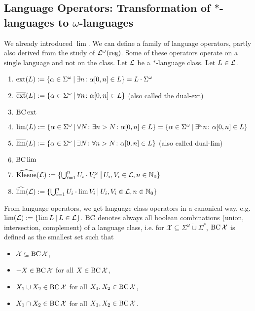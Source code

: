 
\subsection{Language Operators: Transformation of $*$-languages to $\omega$-languages}

We already introduced $\lim$. We can define a family of language operators, partly also derived from the study of $\mathcal{L}^\omega(\text{reg})$. Some of these operators operate on a single language and not on the class. Let $\mathcal{L}$ be a $*$-language class. Let $L \in \mathcal{L}$.

\begin{enumerate}
\item $\ext(L) := \Set{\alpha \in \Sigma^\omega}{ \exists n \colon \alpha[0,n] \in L} = L \cdot \Sigma^\omega$
\item $\dext(L) := \Set{\alpha \in \Sigma^\omega}{ \forall n \colon \alpha[0,n] \in L}$ (also called the dual-ext)
\item $\operatorname{BC} \operatorname{ext}$
\item $\lim(L) := \Set{ \alpha \in \Sigma^\omega }{ \forall N \colon \exists n > N \colon \alpha[0,n] \in L } = \Set{ \alpha \in \Sigma^\omega }{ \exists^\omega n \colon \alpha[0,n] \in L }$
\item $\dlim(L) := \Set{ \alpha \in \Sigma^\omega }{ \exists N \colon \forall n > N \colon \alpha[0,n] \in L }$ (also called dual-lim)
\item $\operatorname{BC} \lim$
\item $\Kleene(\Lang) := \Set{ \bigcup_{i=1}^n U_i \cdot V_i^\omega}{U_i, V_i \in \Lang, n \in \N_0}$
\item $\limClosure(\Lang) := \Set{\bigcup_{i=1}^n U_i \cdot \lim V_i}{U_i, V_i \in \Lang, n \in \N_0}$
\end{enumerate}

From language operators, we get language class operators in a canonical way, e.g. $\lim(\Lang) := \Set{\lim L}{L \in \Lang}$. $\operatorname{BC}$ denotes always all boolean combinations (union, intersection, complement) of a language class, i.e. for $\mathcal{X} \subseteq \Sigma^\omega \mathbin{\dot\cup} \Sigma^*$, $\operatorname{BC} \mathcal{X}$ is defined as the smallest set such that
\begin{itemize}
\item $\mathcal{X} \subseteq \operatorname{BC} \mathcal{X}$,
\item $-X \in \operatorname{BC} \mathcal{X}$ for all $X \in \operatorname{BC} \mathcal{X}$,
\item $X_1 \cup X_2 \in \operatorname{BC} \mathcal{X}$ for all $X_1,X_2 \in \operatorname{BC} \mathcal{X}$,
\item $X_1 \cap X_2 \in \operatorname{BC} \mathcal{X}$ for all $X_1,X_2 \in \operatorname{BC} \mathcal{X}$.
\end{itemize}

